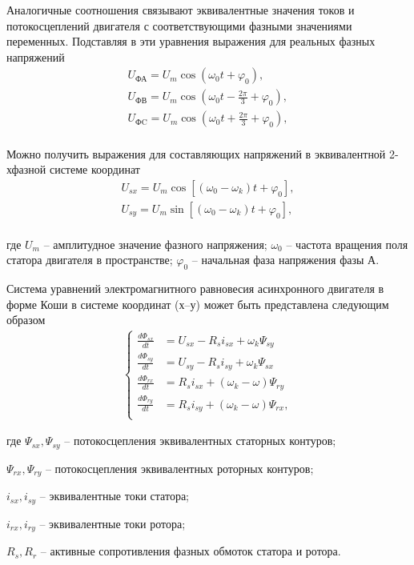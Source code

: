         Аналогичные соотношения связывают эквивалентные значения токов и
        потокосцеплений двигателя с соответствующими фазными значениями
        переменных. Подставляя в эти уравнения выражения для реальных фазных
        напряжений
        \begin{gather*}
            U_\text{ФА} = U_m\cos(\omega_0 t + \varphi_0),\\
            U_\text{ФВ} = U_m\cos\left(\omega_0t-\frac{2\pi}{3}+\varphi_0\right),\\
            U_\text{ФC} = U_m\cos\left(\omega_0t+\frac{2\pi}{3}+\varphi_0\right),\\
        \end{gather*}

        Можно получить выражения для составляющих напряжений в эквивалентной
        2-хфазной системе координат
        \begin{gather*}
            U_{sx} = U_m \cos [(\omega_0 - \omega_k)t + \varphi_0],\\
            U_{sy} = U_m \sin [(\omega_0 - \omega_k)t + \varphi_0],\\
        \end{gather*}

        где $U_m$ -- амплитудное значение фазного напряжения;
        $\omega_0$ -- частота вращения поля статора двигателя в пространстве;
        $\varphi_0$ -- начальная фаза напряжения фазы А.

        Система уравнений электромагнитного равновесия асинхронного двигателя в
        форме Коши в системе координат (х–у) может быть представлена следующим
        образом
        \begin{gather*}
            \left\{
            \begin{aligned}
                \frac{d\Phi_{sx}}{dt} & = U_{sx} - R_s i_{sx} + \omega_k \Psi_{sy}\\
                \frac{d\Phi_{sy}}{dt} & = U_{sy} - R_s i_{sy} + \omega_k \Psi_{sx}\\
                \frac{d\Phi_{rx}}{dt} & = R_s i_{sx} + (\omega_k-\omega) \Psi_{ry}\\
                \frac{d\Phi_{ry}}{dt} & = R_s i_{sy} + (\omega_k-\omega) \Psi_{rx},\\
            \end{aligned}
            \right.
        \end{gather*}

        где $\Psi_{sx}, \Psi_{sy}$ -- потокосцепления эквивалентных статорных
            контуров;\par
        $\Psi_{rx}, \Psi_{ry}$ -- потокосцепления эквивалентных роторных
            контуров;\par
        $i_{sx}, i_{sy}$ -- эквивалентные  токи статора;\par
        $i_{rx}, i_{ry}$ -- эквивалентные  токи ротора;\par
        $R_s, R_r$ -- активные сопротивления фазных обмоток статора и ротора.

